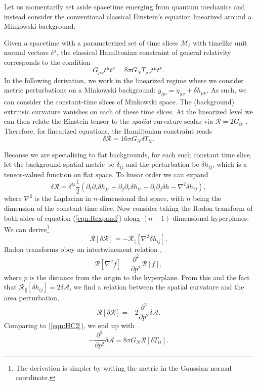 \documentclass[%
12pt,preprint,
nofootinbib,
amsmath,amssymb,
aps,
prd,
showpacs,
superscriptaddress
]{revtex4-2}
\newcommand{\R}{\mathscr{R}}
\newcommand{\area}{\mathcal{A}}
\begin{document}
Let us momentarily set aside spacetime emerging from quantum mechanics and instead consider the conventional classical Einstein's equation linearized around a Minkowski background. 

Given a spacetime with a parameterized set of time slices $\mathcal{M}_t$ with timelike unit normal vectors $t^\mu$, the classical Hamiltonian constraint of general relativity corresponds to the condition
\begin{equation}
G_{\mu\nu}t^{\mu}t^{\nu}= 8\pi G_N T_{\mu\nu}t^{\mu}t^{\nu}.
\end{equation}
In the following derivation, we work in the linearized regime where we consider metric perturbations on a Minkowski background: $g_{\mu\nu} = \eta_{\mu\nu}+\delta h_{\mu\nu}$. As such, we can consider the constant-time slices of Minkowski space.
The (background) extrinsic curvature vanishes on each of these time slices. 
At the linearized level we can then relate the Einstein tensor to the \emph{spatial} curvature scalar via  $\mathcal{R} = 2G_{tt}$ \cite{Gourgoulhon:2007ue}.
Therefore, for linearized equations, the Hamiltonian constraint reads
\begin{equation}
 \delta \mathcal{R} = 16\pi G_N \delta T_{tt}.
\label{eqn:HC2}
\end{equation}

Because we are specializing to flat backgrounds, for each such constant time slice, let the background spatial metric be $\delta_{ij}$ and the perturbation be $\delta h_{ij}$, which is a tensor-valued function on flat space. 
To linear order we can expand 
\begin{equation}
 \delta \mathcal{R}=\delta^{ij}\frac 1 2 (\partial_i\partial_r \delta h_{jr}+\partial_j\partial_r \delta h_{ir}-\partial_i\partial_j\delta h-\nabla^2 \delta h_{ij}),
 \label{eqn:Rexpand}
\end{equation}
where $\nabla^2$ is the Laplacian in $n$-dimensional flat space, with $n$ being the dimension of the constant-time slice. 
Now consider taking the Radon transform of both sides of equation (\ref{eqn:Rexpand}) along $(n-1)$-dimensional hyperplanes. We can derive\footnote{The derivation is simpler by writing the metric in the Gaussian normal coordinate.}
\begin{equation}
 \R[\delta \mathcal{R}]=- \R_{\parallel}[\nabla^2 \delta h_{ij}].
\end{equation}
Radon transforms obey an intertwinement relation \cite{helgason1999Radon},
\begin{equation}
  \R[\nabla^2 f] = \frac{\partial^2}{\partial p^2} \R[f],
\end{equation}
where $p$ is the distance from the origin to the hyperplane.
From this and the fact that $\R_{\parallel}[\delta h_{ij}]=2\delta \area$, we find a relation between the spatial curvature and the area perturbation,
\begin{equation}
 \R[\delta \mathcal{R}] =- 2\frac{\partial^2}{\partial p^2}\delta \area.
\end{equation}
Comparing to (\ref{eqn:HC2}), we end up with
\begin{equation}
-\frac{\partial^2}{\partial p^2}\delta \area = 8\pi G_N \R[\delta T_{tt}].
\label{eqn:Radonricci}
\end{equation}
\end{document}
